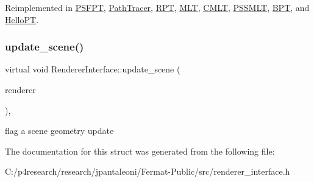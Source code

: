 Reimplemented in \hyperlink{struct_p_s_f_p_t_aac923cb36f8f1d8ad27f01becef44fd9}{P\+S\+F\+PT}, \hyperlink{group___p_t_module_details_ga3e6317495ea6c761968a893b3a54824e}{Path\+Tracer}, \hyperlink{struct_r_p_t_a03e6ba660d7750e633ec69de179e48e7}{R\+PT}, \hyperlink{struct_m_l_t_ac7f187ec2fdd67baedb0cf1d74060b89}{M\+LT}, \hyperlink{struct_c_m_l_t_ad8fe8b00cbe99184c726849da14a5ab2}{C\+M\+LT}, \hyperlink{struct_p_s_s_m_l_t_a0eddc0de7c6a6120153f9be25b8b3a22}{P\+S\+S\+M\+LT}, \hyperlink{struct_b_p_t_af9e940aca306f186cadfabc095590d88}{B\+PT}, and \hyperlink{struct_hello_p_t_af772aac0d80118742450fd8b6b3c58c2}{Hello\+PT}.

\mbox{\label{struct_renderer_interface_a754143d3228c27eab32f1760217afe56}} 
\subsubsection{\texorpdfstring{update\+\_\+scene()}{update\_scene()}}
{\footnotesize\ttfamily virtual void Renderer\+Interface\+::update\+\_\+scene (\begin{DoxyParamCaption}\item[{\hyperlink{struct_rendering_context}{Rendering\+Context} \&}]{renderer }\end{DoxyParamCaption})\hspace{0.3cm}{\ttfamily [inline]}, {\ttfamily [virtual]}}

flag a scene geometry update 

The documentation for this struct was generated from the following file\+:\begin{DoxyCompactItemize}
\item 
C\+:/p4research/research/jpantaleoni/\+Fermat-\/\+Public/src/renderer\+\_\+interface.\+h\end{DoxyCompactItemize}
